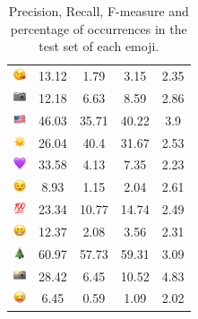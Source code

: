 \documentclass{article}
\begin{document}
\begin{table}
\begin{tabular}{|c|ccc|c|}
\includegraphics[height=0.37cm,width=0.37cm]{img/face_blowing_a_kiss.png} & 13.12 & 1.79 & 3.15 & 2.35\\ 
\includegraphics[height=0.37cm,width=0.37cm]{img/camera.png} & 12.18 & 6.63 & 8.59 & 2.86\\ 
\includegraphics[height=0.37cm,width=0.37cm]{img/United_States.png} & 46.03 & 35.71 & 40.22 & 3.9\\ 
\includegraphics[height=0.37cm,width=0.37cm]{img/sun.png} & 26.04 & 40.4 & 31.67 & 2.53\\ 
\includegraphics[height=0.37cm,width=0.37cm]{img/purple_heart.png} & 33.58 & 4.13 & 7.35 & 2.23\\ 
\includegraphics[height=0.37cm,width=0.37cm]{img/winking_face.png} & 8.93 & 1.15 & 2.04 & 2.61\\ 
\includegraphics[height=0.37cm,width=0.37cm]{img/hundred_points.png} & 23.34 & 10.77 & 14.74 & 2.49\\ 
\includegraphics[height=0.37cm,width=0.37cm]{img/beaming_face_with_smiling_eyes.png} & 12.37 & 2.08 & 3.56 & 2.31\\ 
\includegraphics[height=0.37cm,width=0.37cm]{img/Christmas_tree.png} & 60.97 & 57.73 & 59.31 & 3.09\\ 
\includegraphics[height=0.37cm,width=0.37cm]{img/camera_with_flash.png} & 28.42 & 6.45 & 10.52 & 4.83\\ 
\includegraphics[height=0.37cm,width=0.37cm]{img/winking_face_with_tongue.png} & 6.45 & 0.59 & 1.09 & 2.02\\ 

\hline
\end{tabular}
\caption{\label{table:emoji_detailed} Precision, Recall, F-measure and percentage of occurrences in the test set of each emoji.}
\end{table}
\end{document}
